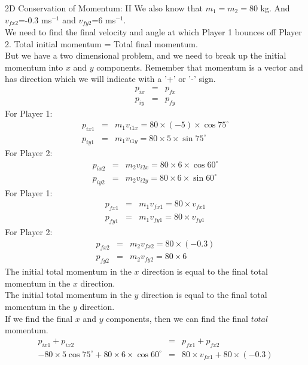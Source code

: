 \begin{wex}{2D Conservation of Momentum: II}
{We also know that $m_{1}=m_{2}=80$ kg. And $v_{fx2}$=-0.3 ms$^{-1}$ and $v_{fy2}$=6 ms$^{-1}$. \\
We need to find the final velocity and angle at which Player 1 bounces off Player 2.
Total initial momentum = Total final momentum. \\
But we have a two dimensional problem, and we need to break up the initial momentum into $x$ and $y$ components. Remember that momentum is a vector and has direction which we will indicate with a '+' or '-' sign.
\begin{eqnarray*}
p_{ix} &=& p_{fx}\\
p_{iy} &=& p_{fy}
\end{eqnarray*}
For Player 1:
\begin{eqnarray*}
p_{ix1} &=& m_{1}v_{i1x} = 80 \times (-5) \times \cos{75^{\circ}} \\
p_{iy1} &=& m_{1}v_{i1y} = 80 \times 5 \times \sin{75^{\circ}}
\end{eqnarray*}
For Player 2:
\begin{eqnarray*}
p_{ix2} &=& m_{2}v_{i2x} = 80 \times 6\times \cos{60^{\circ}} \\
p_{iy2} &=& m_{2}v_{i2y} = 80 \times 6\times \sin{60^{\circ}} 
\end{eqnarray*}
For Player 1:
\begin{eqnarray*}
p_{fx1} &=& m_{1}v_{fx1} = 80 \times v_{fx1}\\
p_{fy1} &=& m_{1}v_{fy1} = 80 \times v_{fy1}
\end{eqnarray*}
For Player 2:
\begin{eqnarray*}
p_{fx2} &=& m_{2}v_{fx2} = 80 \times (-0.3) \\
p_{fy2} &=& m_{2}v_{fy2} = 80 \times 6 
\end{eqnarray*}
The initial total momentum in the $x$ direction is equal to the final total momentum in the $x$ direction.\\
The initial total momentum in the $y$ direction is equal to the final total momentum in the $y$ direction.\\
If we find the final $x$ and $y$ components, then we can find the final $total$ momentum.
\begin{eqnarray*}
p_{ix1} + p_{ix2} &=& p_{fx1} + p_{fx2} \\
-80 \times 5\cos{75^{\circ}} + 80 \times 6 \times \cos{60^{\circ}} &=& 80 \times v_{fx1} + 80\times(-0.3) \\

\end{eqnarray*}}
\end{wex}
